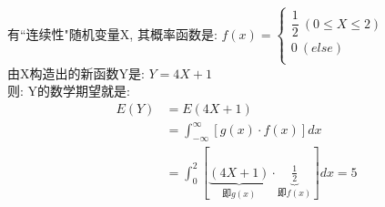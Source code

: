 \documentclass[UTF8]{ctexart}
\begin{document}
	\begin{myEnvSample}
	有``连续性"随机变量X, 其概率函数是: $f\left( x \right) =\left\{ \begin{array}{l}
		\dfrac{1}{2}\ \left( 0\leq X\leq 2 \right)\\
		0\ \left( else \right)\\
	\end{array} \right. $ \\

由X构造出的新函数Y是: $Y=4X+1$ \\
则: Y的数学期望就是: 
\begin{align*}  %
	E(Y) &=E\left( 4X+1 \right)\\
&=\int_{-\infty}^{\infty}{[g(x)\cdot f(x)]dx}\\
&=\int_0^2{[\underset{\text{即}g\left( x \right)}{\underbrace{\left( 4X+1 \right) }}\cdot \underset{\text{即}f\left( x \right)}{\underbrace{\frac{1}{2}}}]}dx =5
\end{align*}
	\end{myEnvSample}
	
	
	
	
	
	
	
\end{document}
